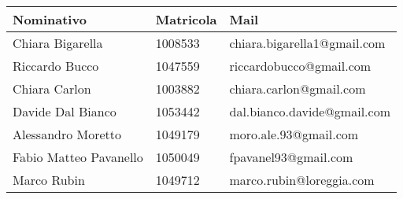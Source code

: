 	\begin{center}
	\begin{tabular}{ | p{4cm} | p{2.5cm} | p{5cm} |}
	\hline
     Nominativo & Matricola & Mail \\ \hline
     Chiara Bigarella & 1008533 & chiara.bigarella1@gmail.com \\ \hline
     Riccardo Bucco & 1047559 & riccardobucco@gmail.com \\ \hline
     Chiara Carlon & 1003882 & chiara.carlon@gmail.com \\ \hline
     Davide Dal Bianco & 1053442 & dal.bianco.davide@gmail.com \\ \hline
     Alessandro Moretto & 1049179 & moro.ale.93@gmail.com \\ \hline
     Fabio Matteo Pavanello & 1050049 & fpavanel93@gmail.com \\ \hline
     Marco Rubin & 1049712 & marco.rubin@loreggia.com \\ \hline
     \end{tabular}
	\end{center}